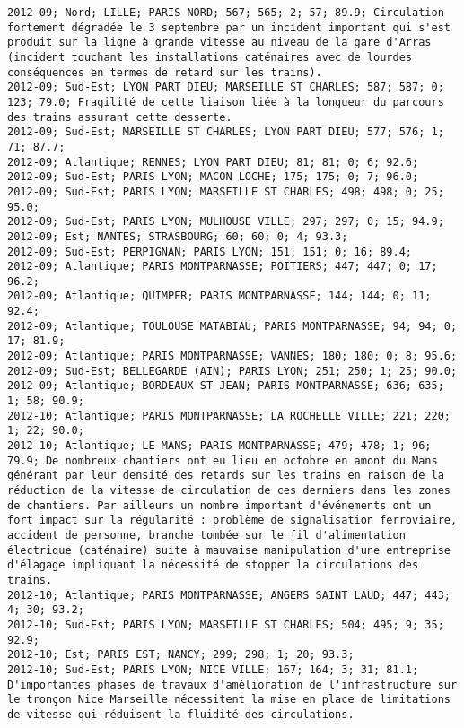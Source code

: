 \documentclass{article}
\begin{document}
\begin{Verbatim}[commandchars=\\\{\}]
2012-09; Nord; LILLE; PARIS NORD; 567; 565; 2; 57; 89.9; Circulation fortement dégradée le 3 septembre par un incident important qui s'est produit sur la ligne à grande vitesse au niveau de la gare d'Arras (incident touchant les installations caténaires avec de lourdes conséquences en termes de retard sur les trains).
2012-09; Sud-Est; LYON PART DIEU; MARSEILLE ST CHARLES; 587; 587; 0; 123; 79.0; Fragilité de cette liaison liée à la longueur du parcours des trains assurant cette desserte.
2012-09; Sud-Est; MARSEILLE ST CHARLES; LYON PART DIEU; 577; 576; 1; 71; 87.7; 
2012-09; Atlantique; RENNES; LYON PART DIEU; 81; 81; 0; 6; 92.6; 
2012-09; Sud-Est; PARIS LYON; MACON LOCHE; 175; 175; 0; 7; 96.0; 
2012-09; Sud-Est; PARIS LYON; MARSEILLE ST CHARLES; 498; 498; 0; 25; 95.0; 
2012-09; Sud-Est; PARIS LYON; MULHOUSE VILLE; 297; 297; 0; 15; 94.9; 
2012-09; Est; NANTES; STRASBOURG; 60; 60; 0; 4; 93.3; 
2012-09; Sud-Est; PERPIGNAN; PARIS LYON; 151; 151; 0; 16; 89.4; 
2012-09; Atlantique; PARIS MONTPARNASSE; POITIERS; 447; 447; 0; 17; 96.2; 
2012-09; Atlantique; QUIMPER; PARIS MONTPARNASSE; 144; 144; 0; 11; 92.4; 
2012-09; Atlantique; TOULOUSE MATABIAU; PARIS MONTPARNASSE; 94; 94; 0; 17; 81.9; 
2012-09; Atlantique; PARIS MONTPARNASSE; VANNES; 180; 180; 0; 8; 95.6; 
2012-09; Sud-Est; BELLEGARDE (AIN); PARIS LYON; 251; 250; 1; 25; 90.0; 
2012-09; Atlantique; BORDEAUX ST JEAN; PARIS MONTPARNASSE; 636; 635; 1; 58; 90.9; 
2012-10; Atlantique; PARIS MONTPARNASSE; LA ROCHELLE VILLE; 221; 220; 1; 22; 90.0; 
2012-10; Atlantique; LE MANS; PARIS MONTPARNASSE; 479; 478; 1; 96; 79.9; De nombreux chantiers ont eu lieu en octobre en amont du Mans générant par leur densité des retards sur les trains en raison de la réduction de la vitesse de circulation de ces derniers dans les zones de chantiers. Par ailleurs un nombre important d'événements ont un fort impact sur la régularité : problème de signalisation ferroviaire, accident de personne, branche tombée sur le fil d'alimentation électrique (caténaire) suite à mauvaise manipulation d'une entreprise d'élagage impliquant la nécessité de stopper la circulations des trains.
2012-10; Atlantique; PARIS MONTPARNASSE; ANGERS SAINT LAUD; 447; 443; 4; 30; 93.2; 
2012-10; Sud-Est; PARIS LYON; MARSEILLE ST CHARLES; 504; 495; 9; 35; 92.9; 
2012-10; Est; PARIS EST; NANCY; 299; 298; 1; 20; 93.3; 
2012-10; Sud-Est; PARIS LYON; NICE VILLE; 167; 164; 3; 31; 81.1; D'importantes phases de travaux d'amélioration de l'infrastructure sur le tronçon Nice Marseille nécessitent la mise en place de limitations de vitesse qui réduisent la fluidité des circulations.

\end{Verbatim}
\end{document}
